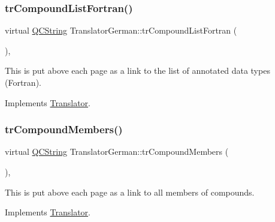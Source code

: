 \mbox{\label{class_translator_german_aa89dfd6d04b73644ba166a6c02ccc79b}} 
\subsubsection{\texorpdfstring{trCompoundListFortran()}{trCompoundListFortran()}}
{\footnotesize\ttfamily virtual \mbox{\hyperlink{class_q_c_string}{Q\+C\+String}} Translator\+German\+::tr\+Compound\+List\+Fortran (\begin{DoxyParamCaption}{ }\end{DoxyParamCaption})\hspace{0.3cm}{\ttfamily [inline]}, {\ttfamily [virtual]}}

This is put above each page as a link to the list of annotated data types (Fortran). 

Implements \mbox{\hyperlink{class_translator}{Translator}}.

\mbox{\label{class_translator_german_a673d5431bace77e2143db6b9c88209d2}} 
\subsubsection{\texorpdfstring{trCompoundMembers()}{trCompoundMembers()}}
{\footnotesize\ttfamily virtual \mbox{\hyperlink{class_q_c_string}{Q\+C\+String}} Translator\+German\+::tr\+Compound\+Members (\begin{DoxyParamCaption}{ }\end{DoxyParamCaption})\hspace{0.3cm}{\ttfamily [inline]}, {\ttfamily [virtual]}}

This is put above each page as a link to all members of compounds. 

Implements \mbox{\hyperlink{class_translator}{Translator}}.

\mbox{\label{class_translator_german_ad1b7f1f9b42e2fe3af663703a0b0936a}} 
